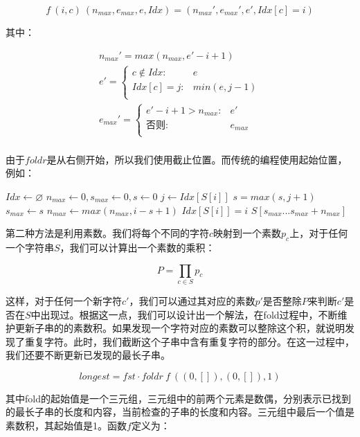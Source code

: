 \documentclass[UTF8]{article}
\begin{document}
\begin{enumerate}
\[
f\ (i, c)\ (n_{max}, e_{max}, e, Idx) = (n_{max}', e_{max}', e', Idx[c] = i)
\]

其中：

\[ \begin{array}{l}
n_{max}' = max(n_{max}, e' - i + 1) \\
e' = \begin{cases}
  c \notin Idx: & e \\
  Idx[c] = j: & min(e, j - 1) \\
  \end{cases} \\
e_{max}' = \begin{cases}
  e' - i + 1 > n_{max}: & e' \\
  \text{否则}: & e_{max} \\
  \end{cases} \\
\end{array} \]

由于$foldr$是从右侧开始，所以我们使用截止位置。而传统的编程使用起始位置，例如：

\begin{algorithmic}
  \State $Idx \gets \varnothing$
  \State $n_{max} \gets 0, s_{max} \gets 0, s \gets 0$
      \State $j \gets Idx[S[i]]$
      \State $s = max(s, j + 1)$
    \EndIf
      \State $s_{max} \gets s$
    \EndIf
    \State $n_{max} \gets max(n_{max}, i - s + 1)$
    \State $Idx[S[i]] = i$
  \EndFor
  \State \Return $S[s_{max} ... s_{max} + n_{max}]$
\EndFunction
\end{algorithmic}

第二种方法是利用素数。我们将每个不同的字符$c$映射到一个素数$p_c$上，对于任何一个字符串$S$，我们可以计算出一个素数的乘积：

\[
P = \displaystyle \prod_{c \in S} p_c
\]

这样，对于任何一个新字符$c'$，我们可以通过其对应的素数$p'$是否整除$P$来判断$c'$是否在$S$中出现过。根据这一点，我们可以设计出一个解法，在fold过程中，不断维护更新子串的的素数积。如果发现一个字符对应的素数可以整除这个积，就说明发现了重复字符。此时，我们截断这个子串中含有重复字符的部分。在这一过程中，我们还要不断更新已发现的最长子串。

\[
longest = fst \cdot foldr\ f\ ((0, []), (0, []), 1)
\]

其中fold的起始值是一个三元组，三元组中的前两个元素是数偶，分别表示已找到的最长子串的长度和内容，当前检查的子串的长度和内容。三元组中最后一个值是素数积，其起始值是1。函数$f$定义为：


\end{enumerate}
\end{document}

